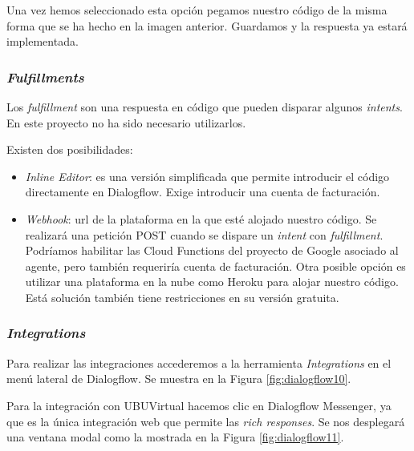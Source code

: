 Una vez hemos seleccionado esta opción pegamos nuestro código de la misma forma que se ha hecho en la imagen anterior. Guardamos y la respuesta ya estará implementada.

\newpage
\subsubsection{\textit{Fulfillments}}

Los \textit{fulfillment} son una respuesta en código que pueden disparar algunos \textit{intents}. En este proyecto no ha sido necesario utilizarlos. 


Existen dos posibilidades:

\begin{itemize}
	\tightlist
	\item 
	\textit{Inline Editor}: es una versión simplificada que permite introducir el código directamente en Dialogflow. Exige introducir una cuenta de facturación.
	\item	
	\textit{Webhook}: url de la plataforma en la que esté alojado nuestro código. Se realizará una petición POST cuando se dispare un \textit{intent} con \textit{fulfillment}. Podríamos habilitar las Cloud Functions del proyecto de Google asociado al agente, pero también requeriría cuenta de facturación. Otra posible opción es utilizar una plataforma en la nube como Heroku para alojar nuestro código. Está solución también tiene restricciones en su versión gratuita.
\end{itemize}

\subsubsection{\textit{Integrations}}

Para realizar las integraciones accederemos a la herramienta \textit{Integrations} en el menú lateral de Dialogflow. Se muestra en la Figura \ref{fig:dialogflow10}.

Para la integración con UBUVirtual hacemos clic en Dialogflow Messenger, ya que es la única integración web que permite las \textit{rich responses}. Se nos desplegará una ventana modal como la mostrada en la Figura \ref{fig:dialogflow11}.


